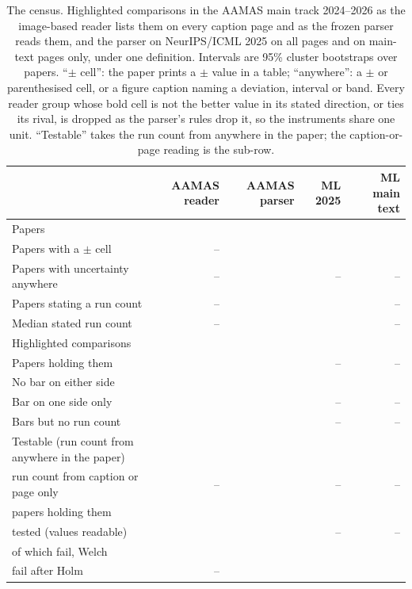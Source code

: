 \documentclass[sigconf,anonymous]{aamas}
\begin{document}
\begin{table}[t]
\caption{The census. Highlighted comparisons in the AAMAS main track
2024--2026 as the image-based reader lists them on every caption page and
as the frozen parser reads them, and the parser on NeurIPS/ICML 2025 on all
pages and on main-text pages only, under one definition. Intervals are 95\%
cluster bootstraps over papers. ``$\pm$ cell'': the paper prints a $\pm$
value in a table; ``anywhere'': a $\pm$ or parenthesised cell, or a figure
caption naming a deviation, interval or band. Every reader group whose
bold cell is not the better value in its stated direction, or ties its
rival, is dropped as the parser's rules drop it, so the instruments share
one unit. ``Testable'' takes the run count from anywhere in the paper;
the caption-or-page reading is the sub-row.}
\label{tab:census}
\centering
\small
\setlength{\tabcolsep}{7pt}
\begin{tabular}{@{}lrrrr@{}}
\toprule
 & AAMAS reader & AAMAS parser & ML 2025 & ML main text \\
\midrule
Papers & \nAPapers{} & \nAPapers{} & \nMlPapers{} & \nMlPapers{} \\
Papers with a $\pm$ cell & -- & \nAPctPapersErr{} & \nMlPctPapersErr{} & \nMlMainPapersErr{} \\
Papers with uncertainty anywhere & -- & \nUaAnywhere{} & -- & -- \\
Papers stating a run count & -- & \nAPctPapersRuns{} & \nMlPctPapersRuns{} & -- \\
Median stated run count & -- & \nAMedianRuns{} & \nMlMedianRuns{} & -- \\
Highlighted comparisons & \nCzGroups{} & \nAComparisons{} & \nMlComparisons{} & \nMlMainComparisons{} \\
Papers holding them & \nCzPapersWithGroups{} & \nClaimPapers{} & -- & -- \\
No bar on either side & \nCzNeitherCi{} & \nAPctNeitherCi{} & \nMlPctNeitherCi{} & \nMlMainNeither{} \\
Bar on one side only & \nCzOneSide{} & \nAPctOneSide{} & -- & -- \\
Bars but no run count & \nCzBarsNoN{} & \nAPctNoN{} & -- & -- \\
Testable (run count from anywhere in the paper) & \nCzTestableCi{} & \nAPctTestableCi{} & \nMlPctTestableCi{} & \nMlMainTestable{} \\
\quad run count from caption or page only & -- & \nSpanCaptionOrPageTestable{} & -- & -- \\
\quad papers holding them & \nCzTestablePapers{} & \nAPapersTestable{} & \nMlTestablePapers{} & \nMlMainTestablePapers{} \\
\quad tested (values readable) & \nCzReaderFailN{} & \nANTestable{} & -- & -- \\
\quad of which fail, Welch & \nCzReaderFail{} & \nAPctFailCi{} & \nMlPctFailCi{} & \nMlMainFail{} \\
\quad fail after Holm & -- & \nAPctFailHolmCi{} & \nMlPctFailHolmCi{} & \nMlMainFailHolm{} \\
\bottomrule
\end{tabular}
\end{table}
\end{document}

